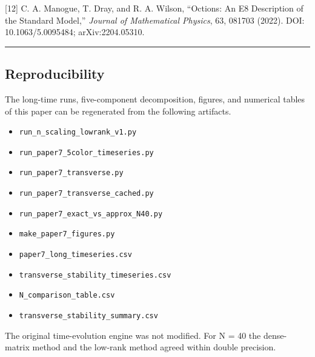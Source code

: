 \documentclass[
  a4paper,
]{article}
\providecommand{\tightlist}{%
  \setlength{\itemsep}{0pt}\setlength{\parskip}{0pt}}
\begin{document}
{[}12{]} C. A. Manogue, T. Dray, and R. A. Wilson, ``Octions: An E8
Description of the Standard Model,'' \emph{Journal of Mathematical
Physics}, 63, 081703 (2022). DOI: 10.1063/5.0095484; arXiv:2204.05310.

\begin{center}\rule{0.5\linewidth}{0.5pt}\end{center}

\subsection{Reproducibility}\label{reproducibility}

The long-time runs, five-component decomposition, figures, and numerical
tables of this paper can be regenerated from the following artifacts.

\begin{itemize}
\tightlist
\item
  \texttt{run\_n\_scaling\_lowrank\_v1.py}
\item
  \texttt{run\_paper7\_5color\_timeseries.py}
\item
  \texttt{run\_paper7\_transverse.py}
\item
  \texttt{run\_paper7\_transverse\_cached.py}
\item
  \texttt{run\_paper7\_exact\_vs\_approx\_N40.py}
\item
  \texttt{make\_paper7\_figures.py}
\item
  \texttt{paper7\_long\_timeseries.csv}
\item
  \texttt{transverse\_stability\_timeseries.csv}
\item
  \texttt{N\_comparison\_table.csv}
\item
  \texttt{transverse\_stability\_summary.csv}
\end{itemize}

The original time-evolution engine was not modified. For N = 40 the
dense-matrix method and the low-rank method agreed within double
precision.
\end{document}
